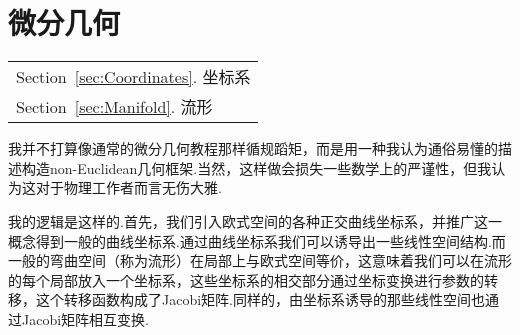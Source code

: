 \part{微分几何}\label{Part:Differential_Geometry}
			\begin{margintable}\vspace{1.4in}\footnotesize
				\begin{tabularx}{\marginparwidth}{|X}
					Section~\ref{sec:Coordinates}. 坐标系\\
					Section~\ref{sec:Manifold}. 流形\\
				\end{tabularx}
			\end{margintable}
	我并不打算像通常的微分几何教程那样循规蹈矩，而是用一种我认为通俗易懂的描述构造non-Euclidean几何框架.当然，这样做会损失一些数学上的严谨性，但我认为这对于物理工作者而言无伤大雅.

	我的逻辑是这样的.首先，我们引入欧式空间的各种正交曲线坐标系，并推广这一概念得到一般的曲线坐标系.通过曲线坐标系我们可以诱导出一些线性空间结构.而一般的弯曲空间（称为流形）在局部上与欧式空间等价，这意味着我们可以在流形的每个局部放入一个坐标系，这些坐标系的相交部分通过坐标变换进行参数的转移，这个转移函数构成了Jacobi矩阵.同样的，由坐标系诱导的那些线性空间也通过Jacobi矩阵相互变换.
	